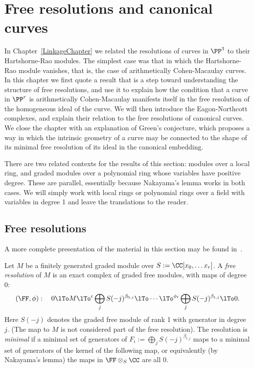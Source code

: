 

\chapter{Free resolutions and canonical curves}
\label{SyzygiesChapter}

\def\length{{\rm length}}

In Chapter~\ref{LinkageChapter} we related the resolutions of curves in $\PP^3$ to their Hartshorne-Rao modules. The
simplest case was that in which the Hartshorne-Rao module vanishes, that is, the case of arithmetically Cohen-Macaulay curves.
In this chapter we first quote a result that is a step toward understanding the structure of free resolutions, and use it to explain how the condition that a curve in $\PP^r$ is arithmetically Cohen-Macaulay manifests itself in the 
free resolution of the homogeneous ideal of the curve.  We will then introduce the Eagon-Northcott complexes, and explain their relation to the free resolutions of canonical curves. We close the chapter with an explanation of Green's conjecture, which proposes a way in which the intrinsic geometry
of a curve may be connected to the shape of its minimal free resolution of its ideal in the canonical embedding.

\begin{remark}
 There are two related contexts for the results of this section:  modules over a local ring, and graded modules over a polynomial ring whose variables have positive degree. These are parallel, essentially because Nakayama's lemma works in both cases. We will simply work with local rings or polynomial rings over a field with variables in degree 1 and leave the translations to the reader.\end{remark}

\section{Free resolutions}
A more complete presentation of the material in this section may be found in~\cite[Chapter 19]{Eisenbud1995}.


Let $M$ be a finitely generated graded module over $S := \CC[x_0, \dots x_r]$. A \emph{free resolution} of $M$ is an exact complex
of graded free modules, with maps of degree 0:
$$
(\FF, \phi):\quad 0\lTo M \lTo^\epsilon \bigoplus_jS(-j)^{\beta_{0,j}} \lTo\cdots
 \lTo^{\phi_t}\bigoplus_jS(-j)^{\beta_{t,j}}\lTo 0.
$$
Here $S(-j)$ denotes the graded free module of rank 1 with generator in degree $j$.
(The map to $M$ is not considered part of the free resolution). The resolution is \emph{minimal} if a minimal set of generators of $F_i := \bigoplus_jS(-j)^{\beta_{t,j}}$ maps to a minimal set of generators of the kernel of the following map,
or equivalently (by Nakayama's lemma) the maps in $\FF\otimes_S \CC$ are all 0.

